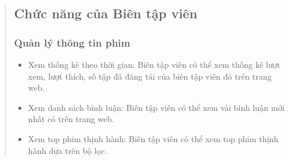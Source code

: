 \begin{quote}
\subsection{Chức năng của Biên tập viên} 

\subsubsection{Quản lý thông tin phim}
\begin{itemize}
    \item Xem thống kê theo thời gian: Biên tập viên có thể xem thống kê lượt xem, lượt thích, số tập đã đăng tải của biên tập viên đó trên trang web.
    \item Xem danh sách bình luận: Biên tập viên có thể xem vài bình luận mới nhất có trên trang web.
    \item Xem top phim thịnh hành: Biên tập viên có thể xem top phim thịnh hành dựa trên bộ lọc.
\end{itemize}

    
\end{quote}


